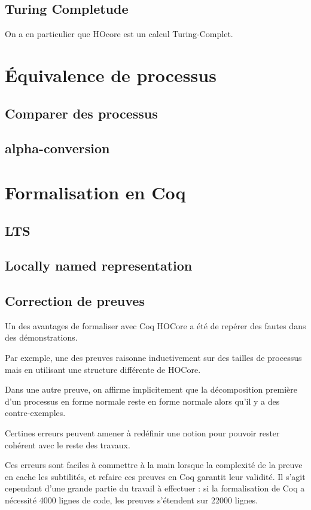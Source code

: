 \documentclass{article}
\begin{document}
\subsection{Turing Completude}
On a en particulier que HOcore est un calcul Turing-Complet. %

\section{Équivalence de processus}
\subsection{Comparer des processus}
\subsection{alpha-conversion}

\section{Formalisation en Coq}
\subsection{LTS}
\subsection{Locally named representation}
\subsection{Correction de preuves}
Un des avantages de formaliser avec Coq HOCore a été de repérer des fautes dans des démonstrations.

Par exemple, une des preuves raisonne inductivement sur des tailles de processus mais en utilisant une structure différente de HOCore.

Dans une autre preuve, on affirme implicitement que la décomposition première d'un processus en forme normale reste en forme normale alors qu'il y a des contre-exemples.

Certines erreurs peuvent amener à redéfinir une notion pour pouvoir rester cohérent avec le reste des travaux.

Ces erreurs sont faciles à commettre à la main lorsque la complexité de la preuve en cache les subtilités, et refaire ces preuves en Coq garantit leur validité. Il s'agit cependant d'une grande partie du travail à effectuer : si la formalisation de Coq a nécessité 4000 lignes de code, les preuves s'étendent sur 22000 lignes. 
\end{document}
